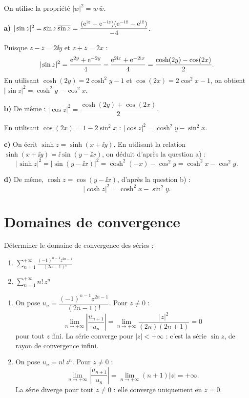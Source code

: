 \documentclass[12pt,a4paper]{article}
\begin{document}
\begin{boitecorrige}
On utilise la propriété $|w|^2 = w\,\bar{w}$.

\textbf{a)} $|\sin z|^2 = \sin z\,\overline{\sin z} = \dfrac{(\mathrm{e}^{\mathrm{i} z}-\mathrm{e}^{-\mathrm{i} z})(\mathrm{e}^{-\mathrm{i}\bar{z}}-\mathrm{e}^{\mathrm{i}\bar{z}})}{-4}$.

Puisque $z - \bar{z} = 2\ii y$ et $z + \bar{z} = 2x$ :
\[
|\sin z|^2 = \frac{\mathrm{e}^{2y}+\mathrm{e}^{-2y}}{4} - \frac{\mathrm{e}^{2\mathrm{i} x}+\mathrm{e}^{-2\mathrm{i} x}}{4}
= \frac{\cosh(2y)-\cos(2x)}{2}.
\]
En utilisant $\cosh(2y) = 2\cosh^2 y - 1$ et $\cos(2x) = 2\cos^2 x - 1$, on obtient $|\sin z|^2 = \cosh^2 y - \cos^2 x$.

\textbf{b)} De même : $|\cos z|^2 = \dfrac{\cosh(2y)+\cos(2x)}{2}$.

En utilisant $\cos(2x) = 1 - 2\sin^2 x$ : $|\cos z|^2 = \cosh^2 y - \sin^2 x$.

\textbf{c)} On écrit $\sinh z = \sinh(x+\ii y)$. En utilisant la relation $\sinh(x+\ii y) = \ii\sin(y-\ii x)$, on déduit d'après la question a) :
\[
|\sinh z|^2 = |\sin(y-\ii x)|^2 = \cosh^2(-x) - \cos^2 y = \cosh^2 x - \cos^2 y.
\]

\textbf{d)} De même, $\cosh z = \cos(y - \ii x)$, d'après la question b) :
\[
|\cosh z|^2 = \cosh^2 x - \sin^2 y.
\]
\end{boitecorrige}

\section{Domaines de convergence}

\begin{boiteexercice}
\niveau{\facile}
Déterminer le domaine de convergence des séries :
\begin{enumerate}
  \item $\displaystyle\sum_{n=1}^{+\infty}\frac{(-1)^{n-1}z^{2n-1}}{(2n-1)!}$
  \item $\displaystyle\sum_{n=1}^{+\infty} n!\,z^n$
\end{enumerate}
\end{boiteexercice}

\begin{boitecorrige}
\begin{enumerate}
\item On pose $u_n = \dfrac{(-1)^{n-1}z^{2n-1}}{(2n-1)!}$. Pour $z \neq 0$ :
\[
\lim_{n\to+\infty}\left|\frac{u_{n+1}}{u_n}\right|
= \lim_{n\to+\infty}\frac{|z|^2}{(2n)(2n+1)} = 0
\]
pour tout $z$ fini. La série converge pour $|z| < +\infty$ : c'est la série $\sin z$, de rayon de convergence infini.

\item On pose $u_n = n!\,z^n$. Pour $z \neq 0$ :
\[
\lim_{n\to+\infty}\left|\frac{u_{n+1}}{u_n}\right| = \lim_{n\to+\infty}(n+1)|z| = +\infty.
\]
La série diverge pour tout $z \neq 0$ : elle converge uniquement en $z = 0$.
\end{enumerate}
\end{boitecorrige}
\end{document}

